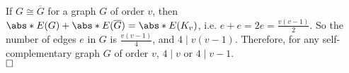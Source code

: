 \label{ch2ex:14}
If $G \cong \overline{G}$ for a graph $G$ of order $v$, then
$\abs*{E(G)} + \abs*{E(\overline{G})} = \abs*{E(K_{v})}$, i.e.
$e + e = 2e = \frac{v(v-1)}{2}$. So the number of edges $e$ in $G$ is
$\frac{v(v-1)}{4}$, and $4 \mid v(v-1)$. Therefore, for any
self-complementary graph $G$ of order $v$, $4 \mid v$ or $4 \mid v - 1$.\\
$\hfill\square$
